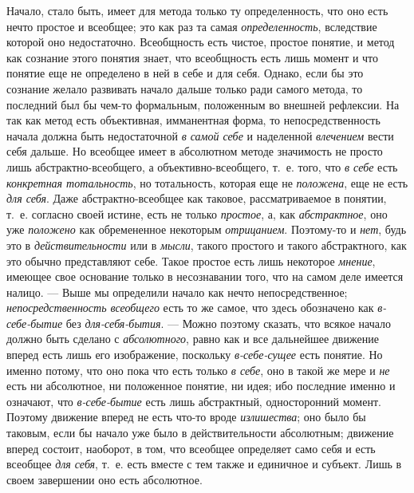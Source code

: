 \documentclass[twoside]{article}
\begin{document}
Начало, стало быть, имеет для метода только ту определенность,
что оно есть нечто простое и всеобщее; это как раз та самая
{\em определенность},
вследствие которой оно недостаточно. Всеобщность есть чистое,
простое понятие, и метод как сознание этого понятия знает, что всеобщность
есть лишь момент и что понятие еще не определено в ней в себе и для себя.
Однако, если бы это сознание желало развивать начало дальше только ради
самого метода, то последний был бы чем-то формальным, положенным во внешней
рефлексии. На так как метод есть объективная, имманентная форма, то
непосредственность начала должна быть недостаточной
{\em в самой себе} и
наделенной {\em влечением}
вести себя дальше. Но всеобщее имеет в абсолютном методе
значимость не просто лишь абстрактно-всеобщего, а объективно-всеобщего,
т.~е. того, что {\em в себе}
есть {\em конкретная
тотальность}, но тотальность, которая еще не
{\em положена}, еще не
есть {\em для себя}. Даже
абстрактно-всеобщее как таковое, рассматриваемое в понятии, т.~е. согласно
своей истине, есть не только
{\em простое}, а, как
{\em абстрактное}, оно
уже {\em положено} как
обремененное некоторым
{\em отрицанием}.
Поэтому-то и {\em нет},
будь это в
{\em действительности}
или в {\em мысли},
такого простого и такого абстрактного, как это обычно
представляют себе. Такое простое есть лишь некоторое
{\em мнение}, имеющее
свое основание только в несознавании того, что на самом деле имеется
налицо. — Выше мы определили начало как нечто
непосредственное;
{\em непосредственность всеобщего}
есть то же самое, что здесь обозначено как
{\em в-себе-бытие }без
{\em для-себя-бытия}. —
Можно поэтому сказать, что всякое начало должно быть сделано
с {\em абсолютного},
равно как и все дальнейшее движение вперед есть лишь его
изображение, поскольку
{\em в-себе-сущее} есть
понятие. Но именно потому, что оно пока что есть только
{\em в себе}, оно в такой
же мере и {\em не} есть
ни абсолютное, ни положенное понятие, ни идея; ибо последние именно и
означают, что {\em в-себе-бытие}
есть лишь абстрактный, односторонний момент. Поэтому движение
вперед не есть что-то вроде
{\em излишества}; оно
было бы таковым, если бы начало уже было в действительности абсолютным;
движение вперед состоит, наоборот, в том, что всеобщее определяет само себя
и есть всеобщее {\em для себя},
т.~е. есть вместе с тем также и единичное и субъект. Лишь в
своем завершении оно есть абсолютное.
\end{document}
